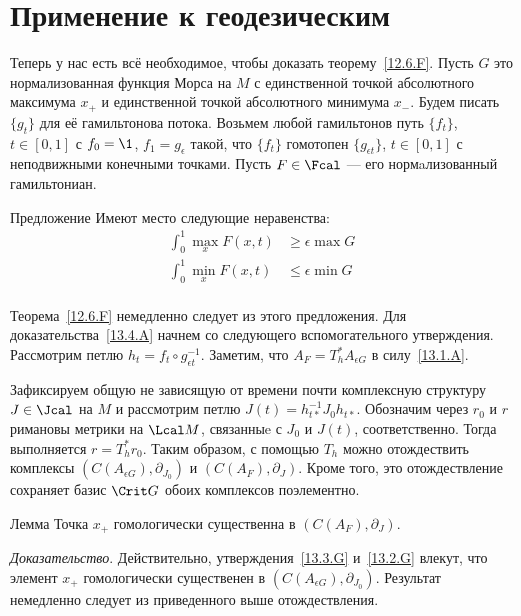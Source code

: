 \section{Применение к геодезическим}\label{13.4}
Теперь у нас есть всё необходимое, чтобы доказать теорему~\ref{12.6.F}.
Пусть $G$ это нормализованная функция Морса на $M$ с единственной точкой абсолютного максимума $x_{+}$ и единственной точкой абсолютного минимума $x_{-}$.
Будем писать $\{g_{t}\}$ для её гамильтонова потока.
Возьмем любой гамильтонов путь $\{f_{t}\}$, $t\in[0,1]$ с $f_{0}=\1$,
$f_{1}=g_{\epsilon}$ такой, что $\{f_{t}\}$ гомотопен $\{g_{\epsilon
t}\}$, $t\in[0,1]$ с неподвижными конечными точками.
Пусть $F\in\Fcal$ --- его нормaлизованный гамильтониан.
\begin{thm}{Предложение}\label{13.4.A}
  Имеют место следующие неравенства:
  \begin{align*}
    \int_{0}^{1}\max_{x}F(x,t) &\geq \epsilon\max G\\
    \int_{0}^{1}\min_{x}F(x,t) &\leq \epsilon\min G\\
  \end{align*}
\end{thm}
Теорема~\ref{12.6.F} немедленно следует из этого предложения.
Для доказательства~\ref{13.4.A} начнем со следующего вспомогательного утверждения.
Рассмотрим петлю $h_{t} = f_{t} \circ g_{\epsilon t}^{-1}$.
Заметим, что $A_{F} = T_{h}^{*}A_{\epsilon G}$ в силу~\ref{13.1.A}.

Зафиксируем общую не зависящую от времени почти комплексную структуру
$J\in\Jcal$ на $M$ и рассмотрим петлю $J(t) = h_{t*}^{-1}
J_{0}h_{t*}$. 
Обозначим через $r_{0}$ и $r$ римановы метрики на $\Lcal M$, связанныe
с $J_{0}$ и $J(t)$, соответственно. 
Тогда выполняется $r = T_{h}^{*}r_{0}$.
Таким образом, с помощью $T_{h}$ можно отождествить комплексы
$(C(A_{\epsilon G}), \partial_{J_{0}})$ и $(C(A_{F}), \partial_{J})$.
Кроме того, это отождествление сохраняет базис $\Crit G$ обоих
комплексов поэлементно.

\begin{thm}{Лемма}\label{13.4.B}
  Точка $x_{+}$ гомологически существенна в $(C(A_{F}), \partial_{J})$.  
\end{thm}

\noindent\textit{Доказательство}.
Действительно, утверждения~\ref{13.3.G} и~\ref{13.2.G} влекут, что
элемент $x_{+}$ гомологически существенен в $(C(A_{\epsilon G}), \partial_{J_{0}})$. 
Результат немедленно следует из приведенного выше отождествления.
\qeds

